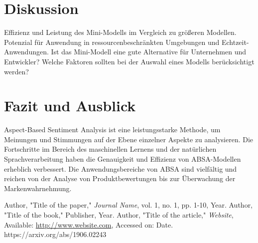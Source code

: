 \documentclass[12pt]{article}
\begin{document}
\section{Diskussion}
Effizienz und Leistung des Mini-Modells im Vergleich zu größeren Modellen. Potenzial für Anwendung in ressourcenbeschränkten Umgebungen und Echtzeit-Anwendungen.
Ist das Mini-Modell eine gute Alternative für Unternehmen und Entwickler? Welche Faktoren sollten bei der Auswahl eines Modells berücksichtigt werden?

\section{Fazit und Ausblick}
Aspect-Based Sentiment Analysis ist eine leistungsstarke Methode, um Meinungen und Stimmungen auf der Ebene einzelner Aspekte zu analysieren.
Die Fortschritte im Bereich des maschinellen Lernens und der natürlichen Sprachverarbeitung haben die Genauigkeit und Effizienz von ABSA-Modellen 
erheblich verbessert. Die Anwendungsbereiche von ABSA sind vielfältig und reichen von der Analyse von Produktbewertungen bis zur Überwachung der 
Markenwahrnehmung.
\begin{thebibliography}{9}
 Author, "Title of the paper," \textit{Journal Name}, vol. 1, no. 1, pp. 1-10, Year.
 Author, "Title of the book," Publisher, Year.
 Author, "Title of the article," \textit{Website}, Available: \url{http://www.website.com}, Accessed on: Date.
https://arxiv.org/abs/1906.02243
\end{thebibliography}
\end{document}

